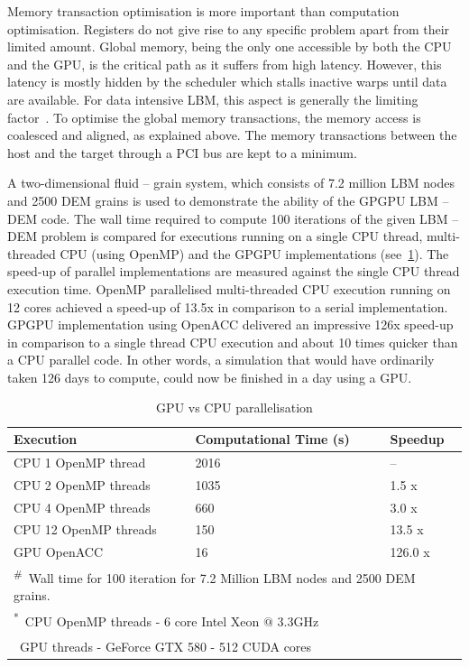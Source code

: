 Memory transaction optimisation is more important than computation
optimisation. Registers do not give rise to any specific problem apart from 
their limited amount. Global memory, being the only one accessible by both the 
CPU and the GPU, is the critical path as it suffers from high latency. However, 
this latency is mostly hidden by the scheduler which stalls inactive warps 
until data are available. For data intensive LBM, this aspect is generally the 
limiting factor~\citep{Obrecht2011}. To optimise the global memory 
transactions, the memory access is coalesced and aligned, as explained above. 
The memory transactions between the host and the target through a PCI bus are 
kept to a minimum.

A two-dimensional fluid -- grain system, which consists of 7.2 million LBM 
nodes and 2500 DEM grains is used to demonstrate the ability of the GPGPU LBM 
-- DEM code. The wall time required to compute 100 iterations of the given LBM 
-- DEM  problem is compared for executions running on a single CPU thread, 
multi-threaded CPU (using OpenMP) and the GPGPU implementations 
(see~\cref{table:GPU}). The speed-up of parallel implementations are measured 
against the single CPU thread execution time. OpenMP parallelised 
multi-threaded CPU execution running on 12 cores achieved a speed-up of 13.5x 
in comparison to a serial implementation. GPGPU implementation using OpenACC 
delivered an impressive 126x speed-up in comparison to a single thread CPU 
execution and about 10 times quicker than a CPU parallel code. In other words, 
a simulation that would have ordinarily taken 126 days to compute, could now be 
finished in a day using a GPU.

\begin{table}[tbhp]
	\caption{GPU vs CPU parallelisation}
	\label{table:GPU}
	\centering
	\begin{tabular}{l l l}
		\toprule
		Execution & Computational Time (s) &  Speedup \\
		\midrule
		CPU 1 OpenMP thread		& 2016	 & -- \\
		CPU 2 OpenMP threads	& 1035	 & 1.5 x \\
		CPU 4 OpenMP threads	& 660 	 & 3.0 x \\
		CPU 12 OpenMP threads	& 150	 & 13.5 x\\
		GPU OpenACC				& 16	 & 126.0 x \\
		\bottomrule
		\multicolumn{3}{l}{\footnotesize{\textsuperscript{\#}}~Wall time 
		for 100 iteration for 7.2 Million LBM nodes and 2500 DEM grains.} \\
		\multicolumn{3}{l}{\footnotesize{\textsuperscript{*}~CPU OpenMP threads 
		- 6 core Intel Xeon $\mathrm{@}$ 3.3GHz}} \\
		\multicolumn{3}{l}{\footnotesize{\textsuperscript{\dag}~GPU threads - 
		GeForce GTX 580 - 512 CUDA cores}}
	\end{tabular}
\end{table}

